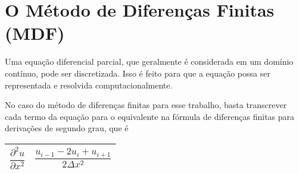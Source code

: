 \section{O Método de Diferenças Finitas (MDF)}

	Uma equação diferencial parcial, que geralmente é considerada em um domínio 
	contínuo, pode ser discretizada. Isso é feito para que a equação possa ser 
	representada e resolvida computacionalmente. 
	
	No caso do método de diferenças	finitas para esse trabalho, basta 
	transcrever cada termo da equação para o equivalente na fórmula de 
	diferenças finitas para derivações de segundo grau, que é
	\begin{table}[H]
		\centering
		\begin{tabular}{c|c}
			\hline
			$\dfrac{\partial^2 u}{\partial x^2}$ & $\dfrac{u_{i-1} - 2u_i + u_{i+1}}{2\Delta x^2}$ \\ \hline
		\end{tabular}
	\end{table}
	
